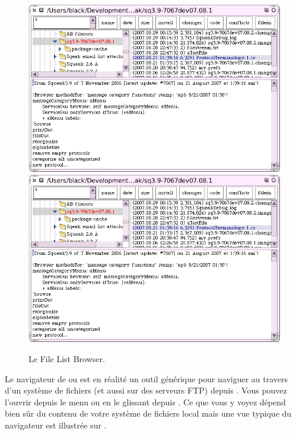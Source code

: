 \documentclass[a4paper,10pt,twoside]{book}
\begin{document}
\begin{figure}[btp]
	\begin{center}
	\ifluluelse
		{\includegraphics[width=\textwidth]{fileList}}
		{\includegraphics[scale=0.7]{fileList}}
	\end{center}
	\caption{Le File List Browser.}
	\label{fig:fileList}
\end{figure}

Le navigateur de  ou  est
en r\'ealit\'e un outil g\'en\'erique pour naviguer au travers d'un syst\`eme de fichiers
(et aussi sur des serveurs FTP) depuis \sq.
Vous pouvez l'ouvrir depuis le menu  ou
en le glissant depuis \toolsflapind.
Ce que vous y voyez d\'epend bien s\^ur du contenu de votre syst\`eme de fichiers local
mais une vue typique du navigateur est illustr\'ee sur 
.
\end{document}
